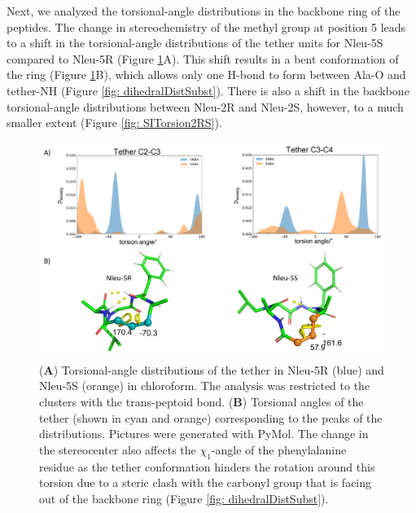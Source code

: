 Next, we analyzed the torsional-angle distributions in the backbone ring of the peptides. The change in stereochemistry of the methyl group at position 5 leads to a shift in the torsional-angle distributions of the tether units for Nleu-5S compared to Nleu-5R (Figure \ref{fig: dihedralDist}A). This shift results in a bent conformation of the ring (Figure \ref{fig: dihedralDist}B), which allows only one H-bond to form between Ala-O and tether-NH (Figure \ref{fig: dihedralDistSubst}). There is also a shift in the backbone torsional-angle distributions between Nleu-2R and Nleu-2S, however, to a much smaller extent (Figure \ref{fig: SITorsion2RS}).

\begin{figure}[h!]
    \centering
    \includegraphics[width=\textwidth]{7_chapter_5/fig/results/dihedral_dist.png}
    \caption{(\textbf{A}) Torsional-angle distributions of the tether in Nleu-5R (blue) and Nleu-5S (orange) in chloroform. The analysis was restricted to the clusters with the trans-peptoid bond. (\textbf{B}) Torsional angles of the tether (shown in cyan and orange) corresponding to the peaks of the distributions. Pictures were generated with PyMol. \cite{Delano2020} The change in the stereocenter also affects the $\chi_1$-angle of the phenylalanine residue as the tether conformation hinders the rotation around this torsion due to a steric clash with the carbonyl group that is facing out of the backbone ring (Figure \ref{fig: dihedralDistSubst}).
    }
    \label{fig: dihedralDist}
\end{figure}

